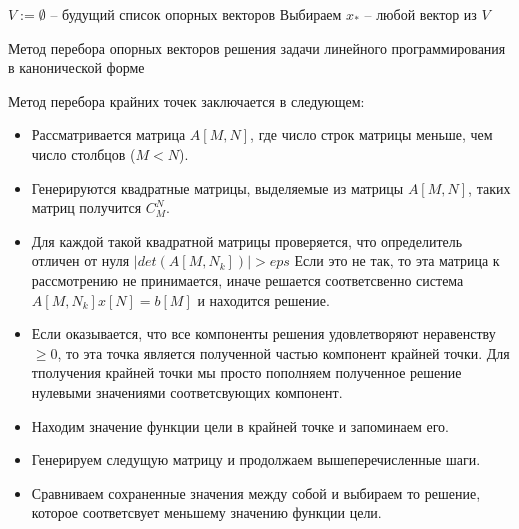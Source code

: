 \documentclass[../body.tex]{subfiles}
\begin{document}
	\begin{algorithm}[H]\label{points}
		$V:=\emptyset$ -- будущий список опорных векторов\;
		Выбираем $x_*$  -- любой вектор из $V$\;
		
		\caption{Метод перебора опорных векторов решения задачи линейного программирования в канонической форме}
	\end{algorithm}
	\vspace{\baselineskip}
	
	Метод перебора крайних точек заключается в следующем:
	\begin{itemize}
\item	Рассматривается матрица $ A[M,N] $, где число строк матрицы меньше, чем число столбцов ($M<N$).
	\item Генерируются квадратные матрицы, выделяемые из матрицы  $ A[M,N] $, таких матриц получится $C_M^N$.
	\item Для каждой такой квадратной матрицы проверяется, что определитель отличен от нуля $|det(A[M,N_k])| > eps$
	Если это не так, то эта матрица к рассмотрению не принимается, иначе решается соответсвенно система $ A[M, N_k]x[N]=b[M] $ и находится решение.
	\item Если оказывается, что все компоненты решения удовлетворяют неравенству $\geq 0 $, то эта точка является полученной частью компонент крайней точки. Для тполучения крайней точки мы просто пополняем полученное решение нулевыми значениями соответсвующих компонент.
	\item Находим значение функции цели в крайней точке и запоминаем его.
	\item Генерируем следущую матрицу и продолжаем вышеперечисленные шаги.
	\item Сравниваем сохраненные значения между собой и выбираем то решение, которое соответсвует меньшему значению функции цели.
	
\end{itemize}

	
\end{document}
